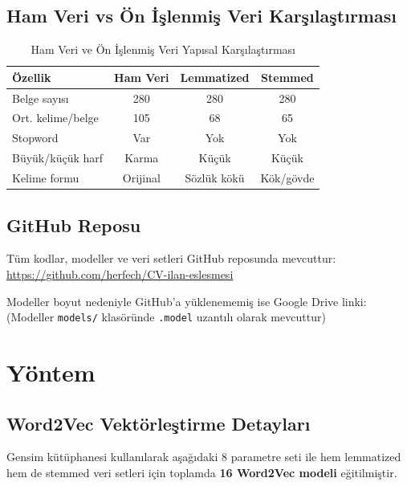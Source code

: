 \documentclass[12pt, a4paper]{article}
\begin{document}
\subsection{Ham Veri vs Ön İşlenmiş Veri Karşılaştırması}

\begin{table}[H]
\centering
\caption{Ham Veri ve Ön İşlenmiş Veri Yapısal Karşılaştırması}
\begin{tabular}{lccc}
\toprule
\textbf{Özellik} & \textbf{Ham Veri} & \textbf{Lemmatized} & \textbf{Stemmed} \\
\midrule
Belge sayısı    & 280    & 280    & 280    \\
Ort. kelime/belge & 105  & 68     & 65     \\
Stopword        & Var    & Yok    & Yok    \\
Büyük/küçük harf & Karma & Küçük  & Küçük  \\
Kelime formu    & Orijinal & Sözlük kökü & Kök/gövde \\
\bottomrule
\end{tabular}
\end{table}

\subsection{GitHub Reposu}

Tüm kodlar, modeller ve veri setleri GitHub reposunda mevcuttur:\\
\url{https://github.com/herfech/CV-ilan-eslesmesi}

Modeller boyut nedeniyle GitHub'a yüklenememiş ise Google Drive linki:\\
(Modeller \texttt{models/} klasöründe \texttt{.model} uzantılı olarak mevcuttur)

\section{Yöntem}

\subsection{Word2Vec Vektörleştirme Detayları}

Gensim kütüphanesi kullanılarak aşağıdaki 8 parametre seti ile hem lemmatized hem de stemmed veri setleri için toplamda \textbf{16 Word2Vec modeli} eğitilmiştir.
\end{document}
